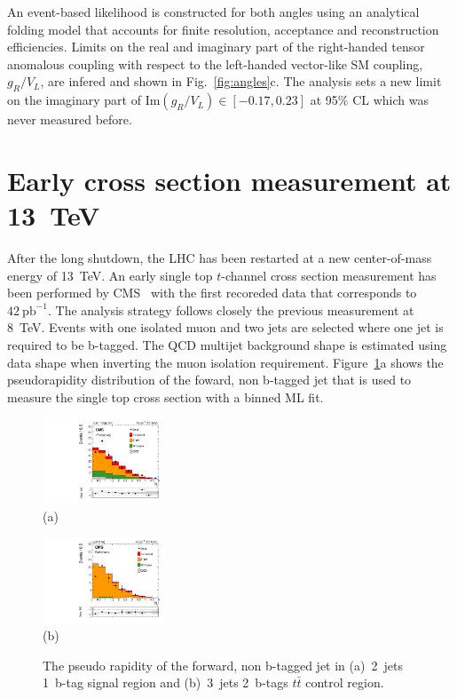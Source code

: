 \documentclass{PoS}
\begin{document}
An event-based likelihood is constructed for both angles using an analytical folding model that accounts for finite resolution, acceptance and reconstruction efficiencies. Limits on the real and imaginary part of the right-handed tensor anomalous coupling with respect to the left-handed vector-like SM coupling, $g_{R}/V_{L}$, are infered and shown in Fig.~\ref{fig:angles}c. The analysis sets a new limit on the imaginary part of $\mathrm{Im}(g_{R}/V_{L})\in[-0.17,0.23]$ at 95\% CL which was never measured before.


\section{Early cross section measurement at 13~TeV}

After the long shutdown, the LHC has been restarted at a new center-of-mass energy of 13~TeV. An early single top $t$-channel cross section measurement has been performed by CMS~\cite{CMS-PAS-TOP-15-004} with the first recoreded data that corresponds to $42~\mathrm{pb}^{-1}$.
The analysis strategy follows closely the previous measurement at 8~TeV. Events with one isolated muon and two jets are selected where one jet is required to be b-tagged. The QCD multijet background shape is estimated using data shape when inverting the muon isolation requirement. Figure~\ref{fig:singletop13}a shows the pseudorapidity distribution of the foward, non b-tagged jet that is used to measure the single top cross section with a binned ML fit. 
\begin{figure}[htbp]
\begin{center}
\parbox[t]{0.45\textwidth}{\centering\includegraphics[width=0.32\textwidth]{cms_xsec13/mu2j1t.pdf}\\(a)}
\parbox[t]{0.45\textwidth}{\centering\includegraphics[width=0.32\textwidth]{cms_xsec13/mu3j2t.pdf}\\(b)}
\end{center}
\caption{\label{fig:singletop13}The pseudo rapidity of the forward, non b-tagged jet in (a)~2~jets 1~b-tag signal region and (b)~3~jets 2~b-tags $t\bar{t}$ control region.}
\end{figure}
\end{document}
